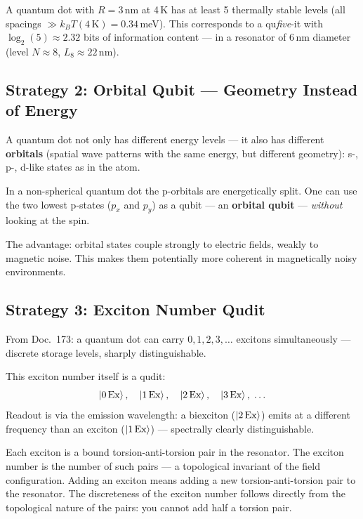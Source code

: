 \begin{keyresult}
A quantum dot with $R = 3$\,nm at 4\,K
has at least 5 thermally stable levels
(all spacings $\gg k_BT(4\,\text{K}) = 0.34$\,meV).
This corresponds to a qu\textit{five}-it with
$\log_2(5) \approx 2.32$ bits of information content ---
in a resonator of 6\,nm diameter (level $N \approx 8$, $L_8 \approx 22$\,nm).
\end{keyresult}

\subsection{Strategy 2: Orbital Qubit --- Geometry Instead of Energy}
\label{sec:orbital}

A quantum dot not only has different energy levels ---
it also has different \textbf{orbitals} (spatial
wave patterns with the same energy, but different
geometry): s-, p-, d-like states as in the atom.

In a non-spherical quantum dot the
p-orbitals are energetically split.
One can use the two lowest p-states ($p_x$ and $p_y$)
as a qubit --- an \textbf{orbital qubit} ---
\emph{without} looking at the spin.

The advantage: orbital states couple strongly to electric
fields, weakly to magnetic noise.
This makes them potentially more coherent in magnetically
noisy environments.

\subsection{Strategy 3: Exciton Number Qudit}
\label{sec:exciton-qudit}

From Doc.~173: a quantum dot can carry $0, 1, 2, 3, \ldots$
excitons simultaneously --- discrete storage levels,
sharply distinguishable.

This exciton number itself is a qudit:
\[
  \left|0\,\text{Ex}\right\rangle,\quad
  \left|1\,\text{Ex}\right\rangle,\quad
  \left|2\,\text{Ex}\right\rangle,\quad
  \left|3\,\text{Ex}\right\rangle,\;\ldots
\]
Readout is via the emission wavelength:
a biexciton ($\left|2\,\text{Ex}\right\rangle$) emits at a
different frequency than an exciton ($\left|1\,\text{Ex}\right\rangle$)
--- spectrally clearly distinguishable.

\begin{foundation}
Each exciton is a bound torsion-anti-torsion pair
in the resonator. The exciton number is the
number of such pairs --- a topological invariant
of the field configuration.
Adding an exciton means adding a new torsion-anti-torsion pair
to the resonator. The discreteness of the exciton number
follows directly from the topological nature of the pairs:
you cannot add half a torsion pair.
\end{foundation}

